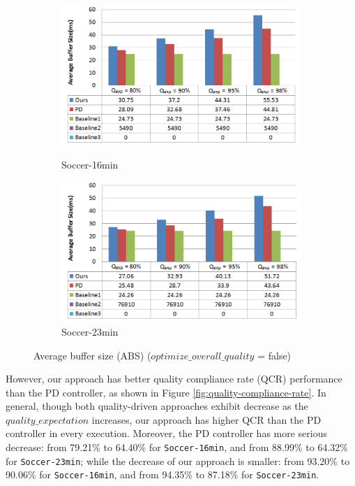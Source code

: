 \documentclass[a4paper, 11pt, twoside]{report}
\begin{document}
\begin{figure}[!hb]
	\centering
	\begin{subfigure}[t]{5in}
		\centering
		\includegraphics[width=5in]{average-buffer-size-16min}
		\caption{Soccer-16min}
		\hspace{5pt}
		\includegraphics[width=5in]{average-buffer-size-23min}
		\caption{Soccer-23min}	
	\end{subfigure}
	\caption{Average buffer size (ABS) ($optimize\_overall\_quality$ = false)}
	\label{fig:average-buffer-size}
\end{figure}

However, our approach has better quality compliance rate (QCR) performance than the PD controller, as shown in Figure \ref{fig:quality-compliance-rate}. In general, though both quality-driven approaches exhibit decrease as the $quality\_expectation$ increases, our approach has higher QCR than the PD controller in every execution. Moreover, the PD controller has more serious decrease: from 79.21\% to 64.40\% for \texttt{Soccer-16min}, and from 88.99\% to 64.32\% for \texttt{Soccer-23min}; while the decrease of our approach is smaller: from 93.20\% to 90.06\% for \texttt{Soccer-16min}, and from 94.35\% to 87.18\% for \texttt{Soccer-23min}.\\
\end{document}
